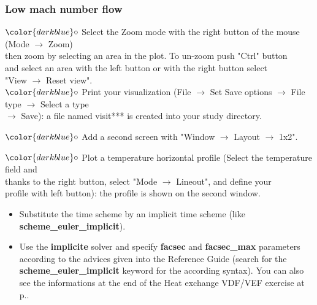 \documentclass[10pt, hyperref={unicode=true,pdfusetitle, bookmarks=true,bookmarksnumbered=false,bookmarksopen=false, breaklinks=false,pdfborder={0 0 1},backref=true,colorlinks=true,linkcolor=darkblue,pageanchor}]{beamer}
\begin{document}
\begin{frame}
\frametitle{Low mach number flow}
\begin{block}{}

\hspace{1cm} $\color{darkblue}\circ$ {\small{Select the Zoom mode with the right button of the mouse (Mode $\rightarrow$ Zoom) \\
\hspace{1.3cm}  then zoom by selecting an area in the plot. To un-zoom push "Ctrl" button \\
\hspace{1.3cm}  and select an area with the left button or with the right button select \\
\hspace{1.3cm}  "View $\rightarrow$ Reset view".}}\\
\hspace{1cm} $\color{darkblue}\circ$ {\small{Print your visualization (File $\rightarrow$ Set Save options $\rightarrow$ File type $\rightarrow$ Select a type \\
\hspace{1.3cm}  $\rightarrow$ Save): a file named visit*** is created into your study directory.}}

\hspace{1cm} $\color{darkblue}\circ$ {\small{Add a second screen with "Window $\rightarrow$ Layout $\rightarrow$ 1x2".}}

\hspace{1cm} $\color{darkblue}\circ$ {\small{Plot a temperature horizontal profile (Select the temperature field and \\
\hspace{1.3cm} thanks to the right button, select "Mode $\rightarrow$ Lineout", and define your \\
\hspace{1.3cm} profile with left button): the profile is shown on the second window.}}

\begin{itemize}
\item Substitute the time scheme by an implicit time scheme (like \textbf{scheme\_euler\_implicit}). 

\item Use the \textbf{implicite} solver and specify \textbf{facsec} and \textbf{facsec\_max} parameters according to the advices given into the Reference Guide (search for the \textbf{scheme\_euler\_implicit} keyword for the according syntax). You can also see the informations at the end of the Heat exchange VDF/VEF exercise at p.\pageref{schema_impl}.
\end{itemize}

\end{block}
\end{frame}
\end{document}
